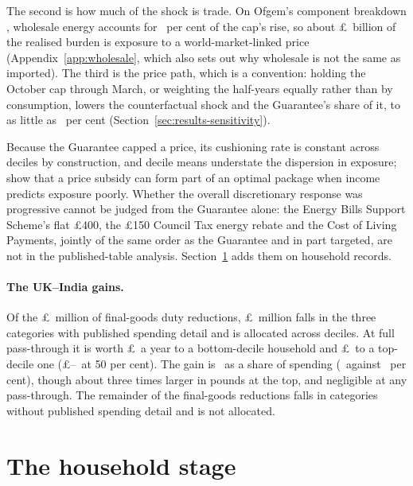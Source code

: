 The second is how much of the shock is trade. On Ofgem's component
breakdown \citep{ofgem2021, ofgem2022}, wholesale energy accounts for
\MsEnergyWholesaleShareOfRisePct\ per cent of the cap's rise, so about
\pounds\MsEnergyRealisedTradeTransmittedAggBn\ billion of the realised
burden is exposure to a world-market-linked price
(Appendix~\ref{app:wholesale}, which also sets out why wholesale is
not the same as imported). The third is the price path, which is a
convention: holding the October cap through March, or weighting the
half-years equally rather than by consumption, lowers the
counterfactual shock and the Guarantee's share of it, to as little as
\SsEpgRateMinPct\ per cent
(Section~\ref{sec:results-sensitivity}).

Because the Guarantee capped a price, its cushioning rate is constant
across deciles by construction, and decile means understate the
dispersion in exposure; \citet{levell2025} show that a price subsidy can
form part of an optimal package when income predicts exposure poorly.
Whether the overall discretionary response was progressive cannot be
judged from the Guarantee alone: the Energy Bills Support Scheme's
flat \pounds 400, the \pounds 150 Council Tax energy rebate and the
Cost of Living Payments, jointly of the same order as the Guarantee
and in part targeted, are not in the published-table analysis.
Section~\ref{sec:results-secondstage} adds them on household records.

\paragraph{The UK--India gains.} Of the \pounds\MsCetaTotalMillions\
million of final-goods duty reductions,
\pounds\MsCetaAllocatedMillions\ million falls in the three categories
with published spending detail and is allocated across deciles. At
full pass-through it is worth \pounds\MsCetaGainGbpPtHundredDecOne\ a
year to a bottom-decile household and
\pounds\MsCetaGainGbpPtHundredDecTen\ to a top-decile one
(\pounds\MsCetaGainGbpPtFiftyDecOne--\MsCetaGainGbpPtFiftyDecTen\ at
50 per cent). The gain is \MsCetaVerdict\ as a share of spending
(\MsCetaBottomPctSpend\ against \MsCetaTopPctSpend\ per cent),
though about three times larger in pounds at the top, and negligible
at any pass-through. The remainder of the final-goods
reductions falls in categories without published spending detail and
is not allocated.

\section{The household stage}\label{sec:results-secondstage}

